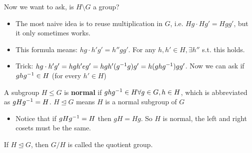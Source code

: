 \documentclass[a4paper]{article}
\begin{document}
Now we want to ask, is $H\setminus G$ a group?
\begin{itemize}
    \item The most naive idea is to reuse multiplication in $G$, i.e. $Hg\cdot Hg'=Hgg'$, but it only sometimes works.
    \item This formula means: $hg\cdot h'g'=h''gg'$. For any $h,h'\in H,\exists h''$ s.t. this holds.
    \item Trick: $hg\cdot h'g'=hgh'eg'=hgh'(g^{-1} g)g'=h(ghg^{-1})gg'$. Now we can ask if $ghg^{-1}\in H$ (for every $h'\in H$)
\end{itemize}
\begin{definition}
    A subgroup $H\leq G$ is \textbf{normal} if $ghg^{-1}\in H\forall g\in G,h\in H$, which is abbreviated as $gHg^{-1}=H$. $H\trianglelefteq G$ means $H$ is a normal subgroup of $G$
\end{definition}
\begin{itemize}
    \item Notice that if $gHg^{-1}=H$ then $gH=Hg$. So $H$ is normal, the left and right cosets must be the same.
\end{itemize}

\begin{definition}
    If $H\trianglelefteq G$, then $G/H$ is called the quotient group.
\end{definition}
\end{document}
